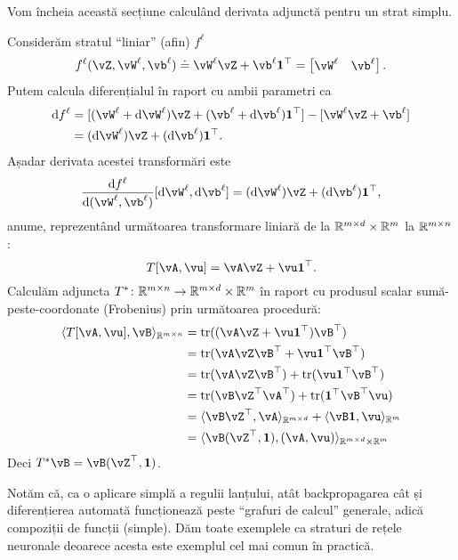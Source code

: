 \documentclass[../../book-main_ro.tex]{subfiles}
\begin{document}
Vom încheia această secțiune calculând derivata adjunctă pentru un strat simplu.
\begin{example}
    Considerăm stratul ``liniar'' (afin) \(f^{\ell}\)
    \begin{equation}
        f^{\ell}(\vZ, \vW^{\ell}, \vb^{\ell}) \doteq \vW^{\ell}\vZ + \vb^{\ell}\vone^{\top} = \mat{\vW^{\ell} & \vb^{\ell}}.
    \end{equation}
    Putem calcula diferențialul în raport cu ambii parametri ca
    \begin{align}
        \odif{f}^{\ell}
        &= [(\vW^{\ell} + \odif{\vW}^{\ell})\vZ + (\vb^{\ell} + \odif{\vb}^{\ell})\vone^{\top}] - [\vW^{\ell}\vZ + \vb^{\ell}] \\ 
        &= (\odif{\vW}^{\ell})\vZ + (\odif{\vb}^{\ell})\vone^{\top}.
    \end{align}
    Așadar derivata acestei transformări este 
    \begin{equation}
        \odv{f^{\ell}}{(\vW^{\ell}, \vb^{\ell})}[\odif{\vW}^{\ell}, \odif{\vb}^{\ell}] = (\odif{\vW}^{\ell})\vZ + (\odif{\vb}^{\ell})\vone^{\top},
    \end{equation}
    anume, reprezentând următoarea transformare liniară de la \(\mathbb{R}^{m \times d} \times \mathbb{R}^{m}\) la \(\mathbb{R}^{m \times n}\):
    \begin{equation}
        T[\vA, \vu] = \vA\vZ + \vu\vone^{\top}.
    \end{equation}
    Calculăm adjuncta \(T^{*} \colon \mathbb{R}^{m \times n} \to \mathbb{R}^{m \times d} \times \mathbb{R}^{m}\) în raport cu produsul scalar sumă-peste-coordonate (Frobenius) prin următoarea procedură:
    \begin{align}
        \ip{T[\vA, \vu]}{\vB}_{\R^{m \times n}} 
        &= \tr((\vA\vZ + \vu\vone^{\top})\vB^{\top}) \\
        &= \tr(\vA\vZ\vB^{\top} + \vu\vone^{\top}\vB^{\top}) \\
        &= \tr(\vA\vZ\vB^{\top}) + \tr(\vu\vone^{\top}\vB^{\top}) \\
        &= \tr(\vB\vZ^{\top}\vA^{\top}) + \tr(\vone^{\top}\vB^{\top}\vu) \\
        &= \ip{\vB\vZ^{\top}}{\vA}_{\R^{m \times d}} + \ip{\vB\vone}{\vu}_{\R^{m}} \\
        &= \ip{\vB(\vZ^{\top}, \vone)}{(\vA, \vu)}_{\R^{m \times d} \times \R^{m}}
    \end{align}
    Deci \(T^{*}\vB = \vB(\vZ^{\top}, \vone)\).
\end{example}

Notăm că, ca o aplicare simplă a regulii lanțului, atât backpropagarea cât și diferențierea automată funcționează peste ``grafuri de calcul'' generale, adică compoziții de funcții (simple). Dăm toate exemplele ca straturi de rețele neuronale deoarece acesta este exemplul cel mai comun în practică.
\end{document}

